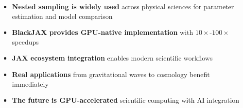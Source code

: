 \documentclass[aspectratio=169]{beamer}
\begin{document}
\begin{frame}
    \begin{itemize}
        \item \textbf{Nested sampling is widely used} across physical sciences for parameter estimation and model comparison
        \item \textbf{BlackJAX provides GPU-native implementation} with $10\times$-$100\times$ speedups
        \item \textbf{JAX ecosystem integration} enables modern scientific workflows
        \item \textbf{Real applications} from gravitational waves to cosmology benefit immediately
        \item \textbf{The future is GPU-accelerated} scientific computing with AI integration
    \end{itemize}
\end{frame}

\appendix
\end{document}
